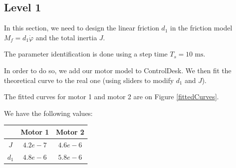 \subsection*{Level 1}

In this section, we need to design the linear friction $d_1$ in the friction model $M_f = d_1 \dot{\varphi}$ and the total inertia $J$.

The parameter identification is done using a step time $T_s = 10 \text{ ms}$.

In order to do so, we add our motor model to ControlDesk. We then fit the theoretical curve to the real one (using sliders to modify $d_1$ and $J$). 

The fitted curves for motor 1 and motor 2 are on Figure \ref{fittedCurves}. 


We have the following values:

\begin{center}
\begin{tabular}{|c|c|c|}
 \hline
 & Motor 1 & Motor 2 \\
 \hline 
 $J$ & $4.2e-7$ & $4.6e-6$ \\ 
 \hline 
 $d_1$ & $4.8e-6$ & $5.8e-6$  \\
 \hline
\end{tabular}
\end{center}


